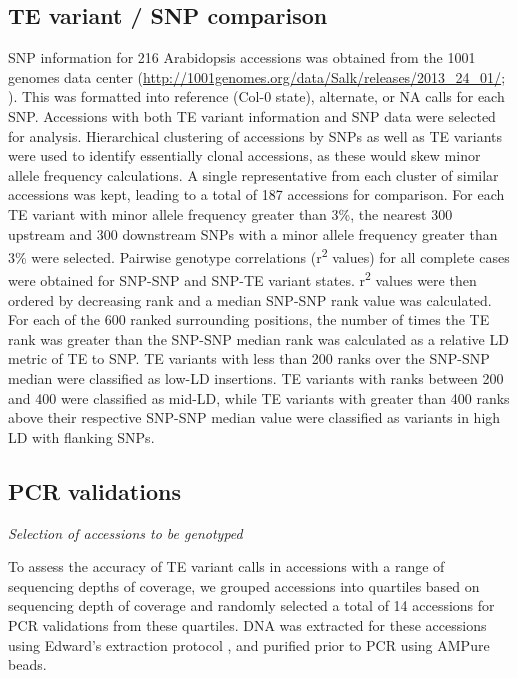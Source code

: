 \documentclass[12pt]{article}
\begin{document}
\subsection{TE variant / SNP comparison}

SNP information for 216 Arabidopsis accessions was obtained from the
1001 genomes data center
(\url{http://1001genomes.org/data/Salk/releases/2013_24_01/}; \cite{Schmitz:2013iu}).
This was formatted into reference (Col-0 state), alternate,
or NA calls for each SNP. Accessions with both TE variant information
and SNP data were selected for analysis. Hierarchical clustering of
accessions by SNPs as well as TE variants were used to identify
essentially clonal accessions, as these would skew minor allele
frequency calculations. A single representative from each cluster of
similar accessions was kept, leading to a total of 187 accessions for
comparison. For each TE variant with minor allele frequency greater than
3\%, the nearest 300 upstream and 300 downstream SNPs with a minor
allele frequency greater than 3\% were selected. Pairwise genotype
correlations (r\textsuperscript{2} values) for all complete cases were obtained for
SNP-SNP and SNP-TE variant states. r\textsuperscript{2} values were then ordered by
decreasing rank and a median SNP-SNP rank value was calculated. For each
of the 600 ranked surrounding positions, the number of times the TE rank
was greater than the SNP-SNP median rank was calculated as a relative LD
metric of TE to SNP. TE variants with less than 200 ranks over the
SNP-SNP median were classified as low-LD insertions. TE variants with
ranks between 200 and 400 were classified as mid-LD, while TE variants
with greater than 400 ranks above their respective SNP-SNP median value
were classified as variants in high LD with flanking SNPs.

\subsection{PCR validations}

\emph{Selection of accessions to be genotyped}

To assess the accuracy of TE variant calls in accessions with a range of
sequencing depths of coverage, we grouped accessions into quartiles
based on sequencing depth of coverage and randomly selected a total of
14 accessions for PCR validations from these quartiles. DNA was
extracted for these accessions using Edward's extraction protocol
\cite{Edwards:1991wp}, and purified prior to PCR using AMPure beads.
\end{document}
